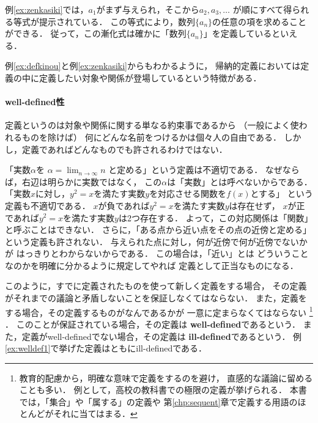   例\ref{ex:zenkasiki}では，$a_1$がまず与えられ，そこから$a_2 , a_3 , \ldots$
  が順にすべて得られる等式が提示されている．
  この等式により，数列$\{ a_n \}$の任意の項を求めることができる．
  従って，この漸化式は確かに「数列$\{a_n \}$」を定義しているといえる．

  例\ref{ex:defkinou}と例\ref{ex:zenkasiki}からもわかるように，
  帰納的定義においては定義の中に定義したい対象や関係が登場しているという特徴がある．

 \paragraph{well-defined性}
  定義というのは対象や関係に関する単なる約束事であるから
  （一般によく使われるものを除けば）
  何にどんな名前をつけるかは個々人の自由である．
  しかし，定義であればどんなものでも許されるわけではない．
  \begin{ex} \label{ex:welldef1}
    「実数$\alpha$を
    $\displaystyle \alpha = \lim_{n \to \infty} n$
    と定める」という定義は不適切である．
    なぜならば，右辺は明らかに実数ではなく，
    この$\alpha$は「実数」とは呼べないからである．
    「実数$x$に対し，$y^2= x$を満たす実数$y$を対応させる関数を$f(x)$とする」
    という定義も不適切である．
    $x$が負であれば$y^2=x$を満たす実数$y$は存在せず，
    $x$が正であれば$y^2=x$を満たす実数$y$は2つ存在する．
    よって，この対応関係は「関数」と呼ぶことはできない．
    さらに，「ある点から近い点をその点の近傍と定める」
    という定義も許されない．
    与えられた点に対し，何が近傍で何が近傍でないかが
    はっきりとわからないからである．
    この場合は，「近い」とは
    どういうことなのかを明確に分かるように規定してやれば
    定義として正当なものになる．
  \end{ex}

  このように，すでに定義されたものを使って新しく定義をする場合，
  その定義がそれまでの議論と矛盾しないことを保証しなくてはならない．
  また，定義をする場合，その定義するものがなんであるかが
  一意に定まらなくてはならない
  \footnote{教育的配慮から，明確な意味で定義をするのを避け，
    直感的な議論に留めることも多い．
    例として，高校の教科書での極限の定義が挙げられる．
    本書では，「集合」や「属する」の定義や
    第\ref{chp:sequent}章で定義する用語のほとんどがそれに当てはまる．
  }
  ．
  このことが保証されている場合，その定義は
  \textbf{well-defined}であるという．
  また，定義がwell-definedでない場合，その定義は
  \textbf{ill-defined}であるという．
  例\ref{ex:welldef1}で挙げた定義はともにill-definedである．

